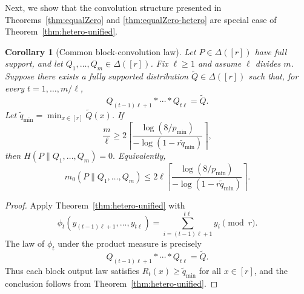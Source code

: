 \documentclass[journal]{IEEEtran}
\newtheorem{corollary}{Corollary}
\newcommand{\1}{\mathbf{1}}
\begin{document}
Next, we show that the convolution structure presented in Theorems~\ref{thm:equalZero} and \ref{thm:equalZero-hetero} are special case of Theorem~\ref{thm:hetero-unified}. 

\begin{corollary}[Common block-convolution law]\label{cor:block-convolution-richness}
Let $P\in\Delta([r])$ have full support, and let $Q_1,\dots,Q_m\in\Delta([r])$. Fix $\ell\ge1$ and assume $\ell$ divides $m$. Suppose there exists a fully supported distribution $\widetilde Q\in\Delta([r])$ such that, for every $t=1,\dots,m/\ell$,
$$
Q_{(t-1)\ell+1}*\cdots*Q_{t\ell}=\widetilde Q.
$$
Let $\widetilde q_{\min}=\min_{x\in[r]}\widetilde Q(x)$. If
$$
\frac{m}{\ell}
\ge
2\left\lceil
\frac{\log(8/p_{\min})}{-\log(1-r\widetilde q_{\min})}
\right\rceil,
$$
then
$H(P\|Q_1,\dots,Q_m)=0.$
Equivalently,
$$
m_0(P\|Q_1,\dots,Q_m)
\le
2\ell
\left\lceil
\frac{\log(8/p_{\min})}{-\log(1-r\widetilde q_{\min})}
\right\rceil.
$$
\end{corollary}
\begin{proof}
Apply Theorem~\ref{thm:hetero-unified} with
$$
\phi_t(y_{(t-1)\ell+1},\dots,y_{t\ell})
=
\sum_{i=(t-1)\ell+1}^{t\ell} y_i
\pmod r.
$$
The law of $\phi_t$ under the product measure is precisely
$$
Q_{(t-1)\ell+1}*\cdots*Q_{t\ell}
=
\widetilde Q.
$$
Thus each block output law satisfies $R_t(x)\ge \widetilde q_{\min}$ for all $x\in[r]$, and the conclusion follows from Theorem~\ref{thm:hetero-unified}.
\end{proof}
\end{document}
